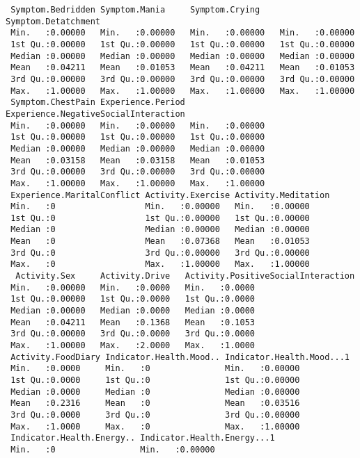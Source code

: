 \documentclass[11pt]{article}
\begin{document}
\begin{verbatim}
 Symptom.Bedridden Symptom.Mania     Symptom.Crying    Symptom.Detatchment
 Min.   :0.00000   Min.   :0.00000   Min.   :0.00000   Min.   :0.00000    
 1st Qu.:0.00000   1st Qu.:0.00000   1st Qu.:0.00000   1st Qu.:0.00000    
 Median :0.00000   Median :0.00000   Median :0.00000   Median :0.00000    
 Mean   :0.04211   Mean   :0.01053   Mean   :0.04211   Mean   :0.01053    
 3rd Qu.:0.00000   3rd Qu.:0.00000   3rd Qu.:0.00000   3rd Qu.:0.00000    
 Max.   :1.00000   Max.   :1.00000   Max.   :1.00000   Max.   :1.00000    
 Symptom.ChestPain Experience.Period Experience.NegativeSocialInteraction
 Min.   :0.00000   Min.   :0.00000   Min.   :0.00000                     
 1st Qu.:0.00000   1st Qu.:0.00000   1st Qu.:0.00000                     
 Median :0.00000   Median :0.00000   Median :0.00000                     
 Mean   :0.03158   Mean   :0.03158   Mean   :0.01053                     
 3rd Qu.:0.00000   3rd Qu.:0.00000   3rd Qu.:0.00000                     
 Max.   :1.00000   Max.   :1.00000   Max.   :1.00000                     
 Experience.MaritalConflict Activity.Exercise Activity.Meditation
 Min.   :0                  Min.   :0.00000   Min.   :0.00000    
 1st Qu.:0                  1st Qu.:0.00000   1st Qu.:0.00000    
 Median :0                  Median :0.00000   Median :0.00000    
 Mean   :0                  Mean   :0.07368   Mean   :0.01053    
 3rd Qu.:0                  3rd Qu.:0.00000   3rd Qu.:0.00000    
 Max.   :0                  Max.   :1.00000   Max.   :1.00000    
  Activity.Sex     Activity.Drive   Activity.PositiveSocialInteraction
 Min.   :0.00000   Min.   :0.0000   Min.   :0.0000                    
 1st Qu.:0.00000   1st Qu.:0.0000   1st Qu.:0.0000                    
 Median :0.00000   Median :0.0000   Median :0.0000                    
 Mean   :0.04211   Mean   :0.1368   Mean   :0.1053                    
 3rd Qu.:0.00000   3rd Qu.:0.0000   3rd Qu.:0.0000                    
 Max.   :1.00000   Max.   :2.0000   Max.   :1.0000                    
 Activity.FoodDiary Indicator.Health.Mood.. Indicator.Health.Mood...1
 Min.   :0.0000     Min.   :0               Min.   :0.00000          
 1st Qu.:0.0000     1st Qu.:0               1st Qu.:0.00000          
 Median :0.0000     Median :0               Median :0.00000          
 Mean   :0.2316     Mean   :0               Mean   :0.03516          
 3rd Qu.:0.0000     3rd Qu.:0               3rd Qu.:0.00000          
 Max.   :1.0000     Max.   :0               Max.   :1.00000          
 Indicator.Health.Energy.. Indicator.Health.Energy...1
 Min.   :0                 Min.   :0.00000            

\end{verbatim}
\end{document}
